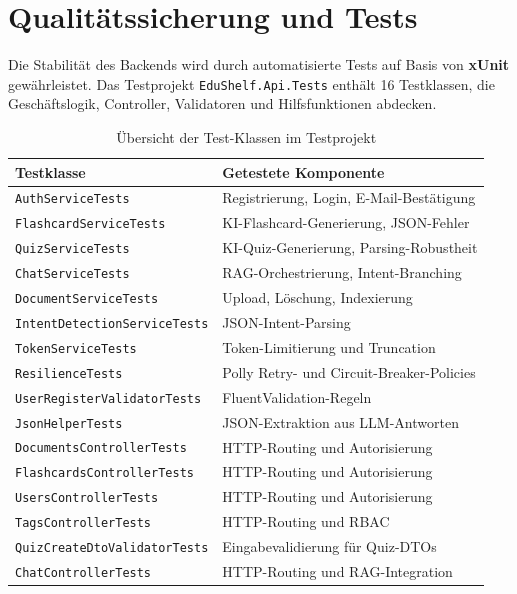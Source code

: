\section{Qualitätssicherung und Tests}
Die Stabilität des Backends wird durch automatisierte Tests auf Basis von \textbf{xUnit} gewährleistet. Das Testprojekt \texttt{EduShelf.Api.Tests} enthält 16 Testklassen, die Geschäftslogik, Controller, Validatoren und Hilfsfunktionen abdecken.

\begin{table}[H]
\centering
\begin{tabular}{|l|l|}
\hline
\textbf{Testklasse} & \textbf{Getestete Komponente} \\
\hline
\texttt{AuthServiceTests}              & Registrierung, Login, E-Mail-Bestätigung \\
\texttt{FlashcardServiceTests}         & KI-Flashcard-Generierung, JSON-Fehler \\
\texttt{QuizServiceTests}             & KI-Quiz-Generierung, Parsing-Robustheit \\
\texttt{ChatServiceTests}             & RAG-Orchestrierung, Intent-Branching \\
\texttt{DocumentServiceTests}         & Upload, Löschung, Indexierung \\
\texttt{IntentDetectionServiceTests}  & JSON-Intent-Parsing \\
\texttt{TokenServiceTests}            & Token-Limitierung und Truncation \\
\texttt{ResilienceTests}              & Polly Retry- und Circuit-Breaker-Policies \\
\texttt{UserRegisterValidatorTests}   & FluentValidation-Regeln \\
\texttt{JsonHelperTests}              & JSON-Extraktion aus LLM-Antworten \\
\texttt{DocumentsControllerTests}     & HTTP-Routing und Autorisierung \\
\texttt{FlashcardsControllerTests}    & HTTP-Routing und Autorisierung \\
\texttt{UsersControllerTests}         & HTTP-Routing und Autorisierung \\
\texttt{TagsControllerTests}          & HTTP-Routing und RBAC \\
\texttt{QuizCreateDtoValidatorTests}  & Eingabevalidierung für Quiz-DTOs \\
\texttt{ChatControllerTests}          & HTTP-Routing und RAG-Integration \\
\hline
\end{tabular}
\caption{Übersicht der Test-Klassen im Testprojekt}
\label{tab:testklassen}
\end{table}

